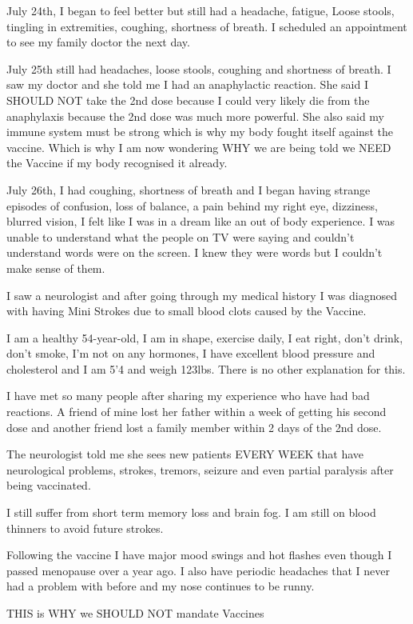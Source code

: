 {July 24th, I began to feel better but still had a headache, fatigue, Loose
stools, tingling in extremities, coughing, shortness of breath. I scheduled an
appointment to see my family doctor the next day.

July 25th still had headaches, loose stools, coughing and shortness of breath. I
saw my doctor and she told me I had an anaphylactic reaction. She said I SHOULD
NOT take the 2nd dose because I could very likely die from the anaphylaxis
because the 2nd dose was much more powerful. She also said my immune system must
be strong which is why my body fought itself against the vaccine. Which is why I
am now wondering WHY we are being told we NEED the Vaccine if my body recognised
it already.

July 26th, I had coughing, shortness of breath and I began having strange
episodes of confusion, loss of balance, a pain behind my right eye, dizziness,
blurred vision, I felt like I was in a dream like an out of body experience. I
was unable to understand what the people on TV were saying and couldn’t
understand words were on the screen. I knew they were words but I couldn’t make
sense of them.

I saw a neurologist and after going through my medical history I was diagnosed
with having Mini Strokes due to small blood clots caused by the Vaccine.

I am a healthy 54-year-old, I am in shape, exercise daily, I eat right, don’t
drink, don’t smoke, I’m not on any hormones, I have excellent blood pressure and
cholesterol and I am 5’4 and weigh 123lbs. There is no other explanation for
this.

I have met so many people after sharing my experience who have had bad
reactions. A friend of mine lost her father within a week of getting his second
dose and another friend lost a family member within 2 days of the 2nd dose.

The neurologist told me she sees new patients EVERY WEEK that have neurological
problems, strokes, tremors, seizure and even partial paralysis after being
vaccinated.

I still suffer from short term memory loss and brain fog. I am still on blood
thinners to avoid future strokes.

Following the vaccine I have major mood swings and hot flashes even though I
passed menopause over a year ago. I also have periodic headaches that I never
had a problem with before and my nose continues to be runny.

THIS is WHY we SHOULD NOT mandate Vaccines

}

